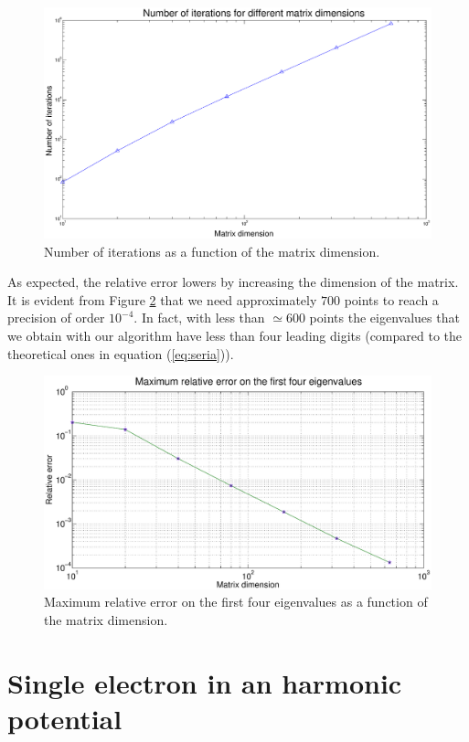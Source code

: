 \documentclass {article}
\begin{document}
\begin{figure}[H]
	\centering
	\includegraphics[width=16cm]{casascemo}
	\caption{Number of iterations as a function of the matrix dimension.}
	\label{fig:iterations}
\end{figure}

As expected, the relative error lowers by increasing the dimension of the matrix. It is evident from Figure \ref{fig:errors} that we need approximately $700$ points to reach a precision of order $10^{-4}$. In fact, with less than $\simeq 600$ points the eigenvalues that we obtain with our algorithm have less than four leading digits (compared to the theoretical ones in equation (\ref{eq:seria})).

\begin{figure}[H]
	\centering
	\includegraphics[width=16cm]{errors}
	\caption{Maximum relative error on the first four eigenvalues as a function of the matrix dimension.}
	\label{fig:errors}
\end{figure}

\section{Single electron in an harmonic potential}
\end{document}
